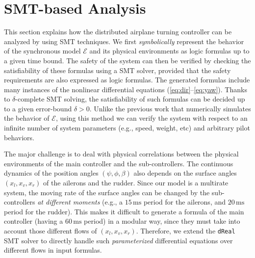 \documentclass{sig-alternate}
\begin{document}
 


\section{SMT-based Analysis}

This section explains how the distributed airplane turning  
controller
can be analyzed by using SMT  techniques.
We first \emph{symbolically} represent 
the behavior  of the synchronous model $\mathcal{E}$
and  its physical environments as logic formulas up to a given time bound. 
The safety of the system can then be verified 
 by checking the satisfiability of these formulas using a SMT solver, 
 provided that the safety requirements are also expressed as logic formulas.
The generated formulas include 
many instances of the nonlinear differential equations (\ref{eq:dir}--\ref{eq:yaw}).
Thanks to $\delta$-complete SMT solving, 
the satisfiability of such formulas can be decided 
up to a given error-bound $\delta > 0$.
Unlike the previous work \cite{ftscs-journal}
that numerically simulates the behavior of $\mathcal{E}$, 
using this method we can verify the system 
with respect to 
an infinite number of  system parameters (e.g., speed, weight, etc)
and arbitrary pilot behaviors.


The major challenge is to deal with physical correlations
between the physical environments of the main controller and the sub-controllers.
The continuous dynamics of the position angles $(\psi, \phi, \beta)$
also depends on the surface angles $(x_l, x_v, x_r)$ of the ailerons and the rudder. 
Since our model is a multirate system,
the moving rate of the surface angles can be changed by the sub-controllers
\emph{at different moments}
(e.g., a $15\,\mathrm{ms}$ period for the ailerons, and $20\,\mathrm{ms}$ period for the rudder).
This makes it difficult to generate a formula of the main controller (having a $60\,\mathrm{ms}$ period) in a modular way,
since they must take into account those different flows of $(x_l, x_v, x_r)$.
Therefore, we extend the \texttt{dReal} SMT solver
to directly handle such \emph{parameterized} differential equations over different flows
in input formulas.



 
\end{document}
